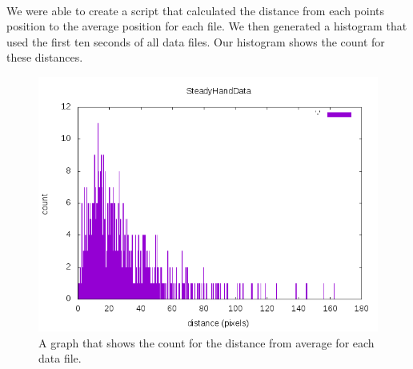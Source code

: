 \documentclass[10pt,letterpaper]{article}
\begin{document}
\paragraph*{} We were able to create a script that calculated the distance from each points position to the average position for each file. We then generated a histogram that used the first ten seconds of all data files. Our histogram shows the count for these distances. 
\begin{figure}
\caption{A graph that shows the count for the distance from average for each data file.}
\graphicspath{ {./} }
\includegraphics{histogram}
\end{figure}
\end{document}
